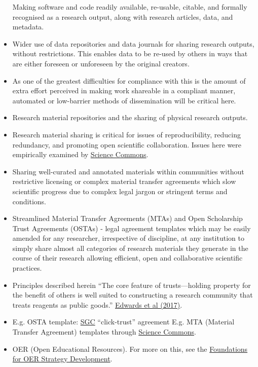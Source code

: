 \begin{itemize}
  Making software and code readily available, re-usable, citable, and
  formally recognised as a research output, along with research
  articles, data, and metadata.
\item
  Wider use of data repositories and data journals for sharing research
  outputs, without restrictions. This enables data to be re-used by
  others in ways that are either foreseen or unforeseen by the original
  creators.
\item
  As one of the greatest difficulties for compliance with this is the
  amount of extra effort perceived in making work shareable in a
  compliant manner, automated or low-barrier methods of dissemination
  will be critical here.
\item
  Research material repositories and the sharing of physical research
  outputs.
\item
  Research material sharing is critical for issues of reproducibility,
  reducing redundancy, and promoting open scientific collaboration.
  Issues here were empirically examined by
  \href{https://creativecommons.org/about/program-areas/open-science/}{Science
  Commons}.
\item
  Sharing well-curated and annotated materials within communities
  without restrictive licensing or complex material transfer agreements
  which slow scientific progress due to complex legal jargon or
  stringent terms and conditions.
\item
  Streamlined Material Transfer Agreements (MTAs) and Open Scholarship
  Trust Agreements (OSTAs) - legal agreement templates which may be
  easily amended for any researcher, irrespective of discipline, at any
  institution to simply share almost all categories of research
  materials they generate in the course of their research allowing
  efficient, open and collaborative scientific practices.
\item
  Principles described herein ``The core feature of trusts---holding
  property for the benefit of others is well suited to constructing a
  research community that treats reagents as public goods.''
  \href{https://doi.org/10.1126/scitranslmed.aai9055}{Edwards et al
  (2017)}.
\item
  E.g. OSTA template: \href{https://www.thesgc.org/click-trust}{SGC}
  ``click-trust'' agreement E.g. MTA (Material Transfer Agreement)
  templates through
  \href{https://creativecommons.org/about/program-areas/open-science/}{Science
  Commons}.
\item
  OER (Open Educational Resources). For more on this, see the
  \href{http://www.oerstrategy.org/home/read-the-doc/}{Foundations for
  OER Strategy Development}.
\end{itemize}

